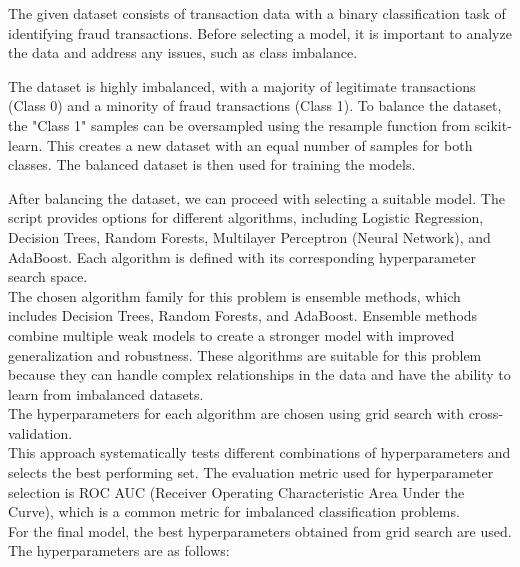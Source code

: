 \documentclass[a4, 10 pt, conference]{ieeeconf}  %
\begin{document}
{\color{black}

\begin{itemize} 
	\textbfn The given dataset consists of transaction data with a binary classification task of identifying fraud transactions. Before selecting a model, it is important to analyze the data and address any issues, such as class imbalance.\newline

	\textbfn The dataset is highly imbalanced, with a majority of legitimate transactions (Class 0) and a minority of fraud transactions (Class 1). To balance the dataset, the "Class 1" samples can be oversampled using the resample function from scikit-learn. This creates a new dataset with an equal number of samples for both classes. The balanced dataset is then used for training the models.\newline

	\textbfn After balancing the dataset, we can proceed with selecting a suitable model. The script provides options for different algorithms, including Logistic Regression, Decision Trees, Random Forests, Multilayer Perceptron (Neural Network), and AdaBoost. Each algorithm is defined with its corresponding hyperparameter search space.\\

	\textbfn The chosen algorithm family for this problem is ensemble methods, which includes Decision Trees, Random Forests, and AdaBoost. Ensemble methods combine multiple weak models to create a stronger model with improved generalization and robustness. These algorithms are suitable for this problem because they can handle complex relationships in the data and have the ability to learn from imbalanced datasets.\\

	\textbfn The hyperparameters for each algorithm are chosen using grid search with cross-validation. \\ This approach 
	systematically tests different combinations of hyperparameters and selects the best performing set. The evaluation metric used for hyperparameter selection is ROC AUC (Receiver Operating Characteristic Area Under the Curve), which is a common metric for imbalanced classification problems.\\

	\textbfn For the final model, the best hyperparameters obtained from grid search are used. The hyperparameters are as follows:


\end{itemize}}
\end{document}
